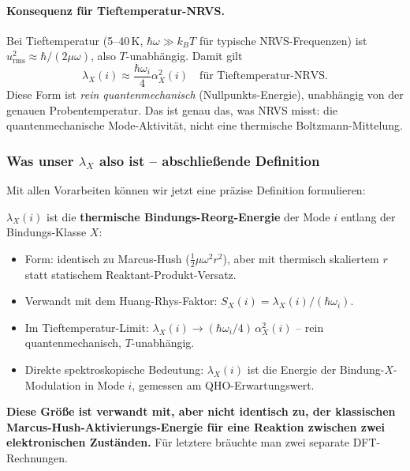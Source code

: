 \documentclass[11pt,a4paper,twoside]{article}
\theoremstyle{remark}
\begin{document}
\paragraph{Konsequenz f\"ur Tieftemperatur-NRVS.}
Bei Tieftemperatur (5--40\,K, $\hbar\omega \gg k_BT$ f\"ur typische
NRVS-Frequenzen) ist $u_\text{rms}^2 \approx \hbar/(2\mu\omega)$, also
$T$-unabh\"angig. Damit gilt
\begin{equation}
  \lambda_X(i) \approx \frac{\hbar\omega_i}{4}\alpha_X^2(i)
  \quad\text{f\"ur Tieftemperatur-NRVS}.
\end{equation}
Diese Form ist \emph{rein quantenmechanisch} (Nullpunkts-Energie),
unabh\"angig von der genauen Probentemperatur. Das ist genau das, was
NRVS misst: die quantenmechanische Mode-Aktivit\"at, nicht eine
thermische Boltzmann-Mittelung.

\subsubsection*{Was unser $\lambda_X$ also ist -- abschlie{\ss}ende Definition}

Mit allen Vorarbeiten k\"onnen wir jetzt eine pr\"azise Definition
formulieren:

\begin{tcolorbox}[colback=accent!5,colframe=accent,
  title={Was $\lambda_X$ in \texttt{modenanalyse\_2fe2s} ist}]
$\lambda_X(i)$ ist die \textbf{thermische Bindungs-Reorg-Energie}
der Mode $i$ entlang der Bindungs-Klasse $X$:
\begin{itemize}\setlength{\itemsep}{0pt}
  \item Form: identisch zu Marcus-Hush ($\tfrac{1}{2}\mu\omega^2 r^2$),
        aber mit thermisch skaliertem $r$ statt statischem
        Reaktant-Produkt-Versatz.
  \item Verwandt mit dem Huang-Rhys-Faktor: $S_X(i) =
        \lambda_X(i)/(\hbar\omega_i)$.
  \item Im Tieftemperatur-Limit:
        $\lambda_X(i) \to (\hbar\omega_i/4)\,\alpha_X^2(i)$
        -- rein quantenmechanisch, $T$-unabh\"angig.
  \item Direkte spektroskopische Bedeutung: $\lambda_X(i)$ ist die
        Energie der Bindung-$X$-Modulation in Mode $i$, gemessen am
        QHO-Erwartungswert.
\end{itemize}

\textbf{Diese Gr\"o{\ss}e ist verwandt mit, aber nicht identisch zu, der
klassischen Marcus-Hush-Aktivierungs-Energie f\"ur eine Reaktion
zwischen zwei elektronischen Zust\"anden.} F\"ur letztere br\"auchte man
zwei separate DFT-Rechnungen.
\end{tcolorbox}
\end{document}
